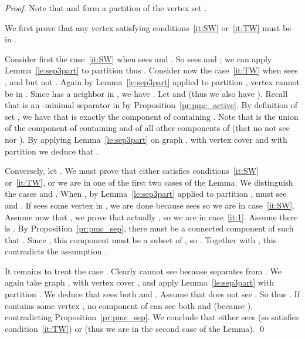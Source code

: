 \documentclass{llncs}
\begin{document}
\begin{proof}


Note that  and  form a partition of the vertex set .

We first prove that any vertex  satisfying conditions~\ref{it:SW} or~\ref{it:TW} must be in . 

Consider first the case~\ref{it:SW} when  sees  and . So  sees  and ; we can apply Lemma~\ref{le:sep3part} to partition  
thus .
Consider now the case~\ref{it:TW} when  sees ,  and  but not . Again by Lemma~\ref{le:sep3part} applied to partition , vertex  cannot be in . Since  has a neighbor in , we have . Let  and  (thus we also have ). Recall that  is an -minimal separator in  by Proposition~\ref{pr:pmc_active}. By definition of set , we have that  is exactly the component of  containing . Note that  is the union of the component of   containing  and of all other components of  (that no not see  nor ). By applying Lemma~\ref{le:sep3part} on graph , with vertex cover  and with partition  we deduce that . 

Conversely, let . We must prove that either  satisfies conditions~\ref{it:SW} or~\ref{it:TW}, or we are in one of the first two cases of the Lemma. 
We distinguish the cases  and . When , by Lemma~\ref{le:sep3part} applied to partition ,  must see  and . If  sees some vertex in , we are done because  sees   so we are in case~\ref{it:SW}. Assume now that , we prove that actually , so we are in case~\ref{it:1}. Assume there is . By Proposition~\ref{pr:pmc_sep}, there must be a connected component  of  such that . Since , this component  must be a subset of , so . Together with , this contradicts the assumption . 

It remains to treat the case . Clearly  cannot see  because  separates  from . 
We again take graph , with vertex cover , and apply Lemma~\ref{le:sep3part} with partition . We deduce that  sees both   and
. Assume that  does not see . So  thus . 
If  contains some vertex , no component of  can see both  and  (because ), contradicting Proposition~\ref{pr:pmc_sep}. We conclude that either  sees  (so satisfies condition~\ref{it:TW}) or  (thus we are in the second case of the Lemma).
\qed
\end{proof}
\end{document}
